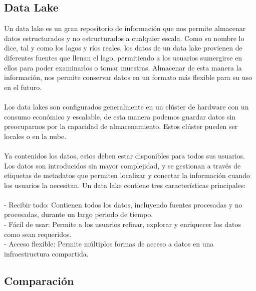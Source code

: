 \documentclass[11pt,twocolumn]{article}
\begin{document}
\subsection{Data Lake}
Un data lake es un gran repositorio de información que nos permite almacenar datos estructurados y no estructurados a cualquier escala. Como su nombre lo dice, tal y como los lagos y ríos reales, los datos de un data lake provienen de diferentes fuentes que llenan el lago, permitiendo a los usuarios sumergirse en ellos para poder examinarlos o tomar muestras. Almacenar de esta manera la información, nos permite conservar datos en un formato más flexible para su uso en el futuro.
\\\\
Los data lakes son configurados generalmente en un clúster de hardware con un consumo económico y escalable, de esta manera podemos guardar datos sin preocuparnos por la capacidad de almacenamiento. Estos clúster pueden ser locales o en la nube.
\\\\
Ya contenidos los datos, estos deben estar disponibles para todos sus usuarios. Los datos son introducidos sin mayor complejidad, y se gestionan a través de etiquetas de metadatos que permiten localizar y conectar la información cuando los usuarios la necesitan. Un data lake contiene tres características principales:
\\\\
{- Recibir todo: Contienen todos los datos, incluyendo fuentes procesadas y no procesadas, durante un largo periodo de tiempo.}
 \\{- Fácil de usar: Permite a los usuarios refinar, explorar y enriquecer los datos como sean requeridos.}
 \\{- Acceso flexible: Permite múltiplos formas de acceso a datos en una infraestructura compartida.}


\subsection{Comparaci\'on}
\end{document}

